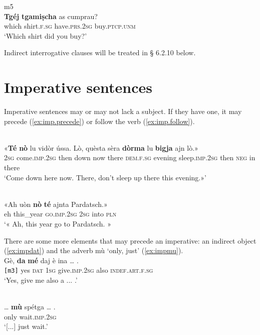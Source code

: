 \ea
\label{}
 {m5}\\
\gll \textbf{Tgéj} \textbf{tgamiṣcha} as cumprau?\\
which shirt.\textsc{f.sg} have.\textsc{prs.2sg} buy.\textsc{ptcp.unm}\\
\glt `Which shirt did you buy?'
\z



Indirect interrogative clauses will be treated in § 6.2.10 below.


\section{Imperative sentences}
Imperative sentences may or may not lack a subject. If they have one, it may precede (\ref{ex:imp.precede}) or follow the verb (\ref{ex:imp.follow}).

\ea
\label{ex:imp.precede}
\\
\gll «\textbf{Té} \textbf{nò} lu vidòr ússa. Lò, quèsta sèra \textbf{dòrma} lu \textbf{bigja} ajn lò.»\\
\textsc{2sg} come.\textsc{imp.2sg} then down now there  \textsc{dem.f.sg} evening sleep.\textsc{imp.2sg} then \textsc{neg} in there\\
\glt `Come down here now. There, don’t sleep up there this evening.»'
\z

\ea
\label{ex:imp.follow}
\\
	\gll  «Ah uòn \textbf{nò} \textbf{té} ajnta Pardatsch.»\\
eh this\_year \textsc{go.imp.2sg} \textsc{2sg} into \textsc{pln}\\
\glt `« Ah, this year go to Pardatsch. »
\z

There are some more elements that may precede an imperative: an indirect object (\ref{ex:impdat}) and the adverb mù `only, just' (\ref{ex:impmu}).
\ea
\label{ex:impdat}
\\
\gll Gè, \textbf{da} \textbf{mé} daj è ina … . \\
 \texttt{[m3]} yes \textsc{dat} \textsc{1sg} give.\textsc{imp.2sg} also \textsc{indef.art.f.sg} \\ 
\glt `Yes, give me also a ... .'
\z

\ea
\label{ex:impdat}
\\
\gll [...] … \textbf{mù} spétga … .\\
{} only wait.\textsc{imp.2sg}\\
\glt `[...] just wait.'
\z


